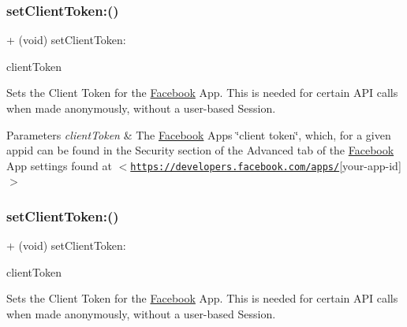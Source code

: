 \subsubsection{\texorpdfstring{set\+Client\+Token\+:()}{setClientToken:()}\hspace{0.1cm}{\footnotesize\ttfamily [1/5]}}
{\footnotesize\ttfamily + (void) set\+Client\+Token\+: \begin{DoxyParamCaption}\item[{(N\+S\+String $\ast$)}]{client\+Token }\end{DoxyParamCaption}}

Sets the Client Token for the \hyperlink{interfaceFacebook}{Facebook} App. This is needed for certain A\+PI calls when made anonymously, without a user-\/based Session.


\begin{DoxyParams}{Parameters}
{\em client\+Token} & The \hyperlink{interfaceFacebook}{Facebook} App\textquotesingle{}s \char`\"{}client token\char`\"{}, which, for a given appid can be found in the Security section of the Advanced tab of the \hyperlink{interfaceFacebook}{Facebook} App settings found at $<$\href{https://developers.facebook.com/apps/}{\tt https\+://developers.\+facebook.\+com/apps/}\mbox{[}your-\/app-\/id\mbox{]}$>$ \\
\hline
\end{DoxyParams}
\mbox{\label{interfaceFBSettings_a07cfc161668c190bf5fd37934821c4de}} 
\subsubsection{\texorpdfstring{set\+Client\+Token\+:()}{setClientToken:()}\hspace{0.1cm}{\footnotesize\ttfamily [2/5]}}
{\footnotesize\ttfamily + (void) set\+Client\+Token\+: \begin{DoxyParamCaption}\item[{(N\+S\+String $\ast$)}]{client\+Token }\end{DoxyParamCaption}}

Sets the Client Token for the \hyperlink{interfaceFacebook}{Facebook} App. This is needed for certain A\+PI calls when made anonymously, without a user-\/based Session.


